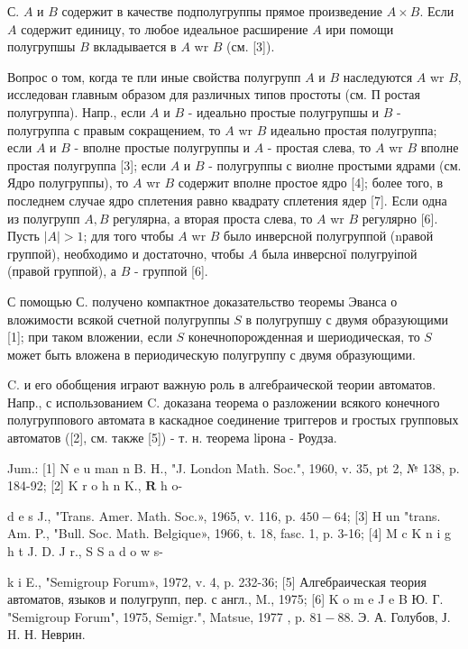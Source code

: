 \documentclass[10pt]{article}
\begin{document}
С. $A$ и $B$ содержит в качестве подполугруппы прямое произведение $A \times B$. Если $A$ содержит единицу, то любое идеальное расширение $A$ ири помощи полугрупшы $B$ вкладывается в $A$ wr $B$ (см. [3]).



Вопрос о том, когда те пли иные свойства полугрупп $A$ и $B$ наследуются $A$ wr $B$, исследован главным образом для различных типов простоты (см. П ростая полугруппа). Напр., если $A$ и $B$ - идеально простые полугрупшы и $B$ - полугруппа с правым сокращением, то $A$ wr $B$ идеально простая полугруппа; если $A$ и $B$ - вполне простые полугруппы и $A$ - простая слева, то $A$ wr $B$ вполне простая полугруппа [3]; если $A$ и $B$ - полугруппы с виолне простыми ядрами (см. Ядро полугруппы), то $A$ wr $B$ содержит вполне простое ядро [4]; более того, в последнем случае ядро сплетения равно квадрату сплетения ядер [7]. Если одна из полугрупп $A, B$ регулярна, а вторая проста слева, то $A$ wr $B$ регулярно [6]. Пусть $|A|>1$; для того чтобы $A$ wr $B$ было инверсной полугруппой (nравой группой), необходимо и достаточно, чтобы $A$ была инверсної полугруіпой (правой группой), а $B$ - группой [6].



С помощью С. получено компактное доказательство теоремы Эванса о вложимости всякой счетной полугруппы $S$ в полугрупшу с двумя образующими [1]; при таком вложении, если $S$ конечнопорожденная и шериодическая, то $S$ может быть вложена в периодическую полугруппу с двумя образующими.



C. и его обобщения играют важную роль в алгебраической теории автоматов. Напр., с использованием C. доказана теорема о разложении всякого конечного полугруппового автомата в каскадное соединение триггеров и гростых групповых автоматов ([2], см. также [5]) - т. н. теорема lірона - Роудза.



Jum.: [1] N e u man n B. H., "J. London Math. Soc.", 1960, v. 35, pt 2, № 138, p. 184-92; [2] K r o h n K., $\mathbf{R}$ h o-

d e s J., "Trans. Amer. Math. Soc.», 1965, v. 116, p. $450-64$; [3] H un "trans. Am. P., "Bull. Soc. Math. Belgique», 1966, t. 18, fasc. 1, p. 3-16; [4] M c K n i g h t J. D. J r., S S a d o w s-

k i E., "Semigroup Forum», 1972, v. 4, p. 232-36; [5] Алгебраическая теория автоматов, языков и полугрупп, пер. с англ., M., 1975; [6] K o m e J e B Ю. Г. "Semigroup Forum", 1975, Semigr.", Matsue, 1977 , p. $81-88$. Э. А. Голубов, Ј. H. Н. Неврин.
\end{document}
